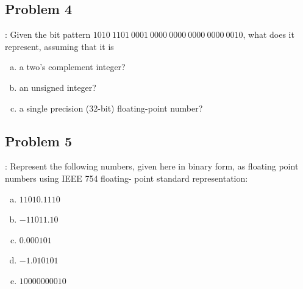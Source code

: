 \documentclass{../slides}
\begin{document}
\subsection{Problem 4}
\begin{frame}{\secname: \subsecname}
    Given the bit pattern $1010\ 1101\ 0001\ 0000\ 0000\ 0000\ 0000\ 0010$, what does it represent, assuming that it is
    \begin{enumerate}[(a)]
        \item a two's complement integer?
        \item an unsigned integer?
        \item a single precision (32-bit) floating-point number?
    \end{enumerate}
\end{frame}

\subsection{Problem 5}
\begin{frame}{\secname: \subsecname}
    Represent the following numbers, given here in binary form, as floating point numbers using IEEE 754 floating- point standard representation:
    \begin{enumerate}[(a)]
        \item $11010.1110$
        \item $-11011.10$
        \item $0.000101$
        \item $-1.010101$
        \item $10000000010$
    \end{enumerate}
\end{frame}
\end{document}
